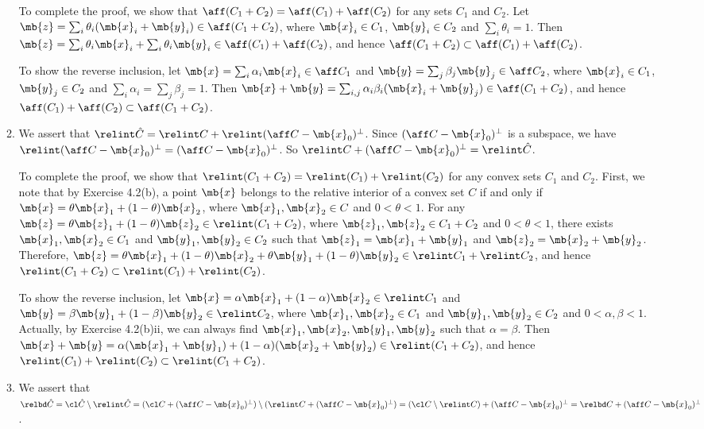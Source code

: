 \begin{exercise}
\begin{enumerate}
\begin{solution}
\begin{enumerate}
            To complete the proof, we show that $\aff(C_1 + C_2)=\aff(C_1)+\aff(C_2)$ for any sets $C_1$ and $C_2$. Let $\mb{z} = \sum_i \theta_i(\mb{x}_i + \mb{y}_i)\in\aff(C_1+C_2)$, where $\mb{x}_i\in C_1$, $\mb{y}_i\in C_2$ and $\sum_i \theta_i = 1$. Then $\mb{z} = \sum_i \theta_i\mb{x}_i + \sum_i \theta_i\mb{y}_i\in \aff(C_1) + \aff(C_2)$, and hence $\aff(C_1+C_2)\subset\aff(C_1)+\aff(C_2)$. 

            To show the reverse inclusion, let $\mb{x} = \sum_i \alpha_i\mb{x}_i \in \aff C_1$ and $\mb{y} = \sum_j \beta_j\mb{y}_j \in \aff C_2$, where $\mb{x}_i\in C_1$, $\mb{y}_j\in C_2$ and $\sum_i \alpha_i = \sum_j \beta_j = 1$. Then $\mb{x} + \mb{y} = \sum_{i,j} \alpha_i\beta_i(\mb{x}_i + \mb{y}_j) \in \aff(C_1+C_2)$, and hence $\aff(C_1)+\aff(C_2)\subset\aff(C_1+C_2)$. 
          \item We assert that $\relint \hat{C} = \relint C + \relint (\aff C-\mb{x}_0)^\perp$. Since $(\aff C-\mb{x}_0)^\perp$ is a subspace, we have $\relint (\aff C-\mb{x}_0)^\perp = (\aff C-\mb{x}_0)^\perp$. So $\relint C + (\aff C-\mb{x}_0)^\perp = \relint \hat{C}$.

            To complete the proof, we show that $\relint(C_1 + C_2)=\relint(C_1)+\relint(C_2)$ for any convex sets $C_1$ and $C_2$. First, we note that by Exercise 4.2(b), a point $\mb{x}$ belongs to the relative interior of a convex set $C$ if and only if $\mb{x} = \theta\mb{x}_1 + (1-\theta)\mb{x}_2$, where $\mb{x}_1, \mb{x}_2\in C$ and $0<\theta<1$. For any $\mb{z} = \theta\mb{z}_1 + (1-\theta)\mb{z}_2\in\relint(C_1+C_2)$, where $\mb{z}_1, \mb{z}_2\in C_1+C_2$ and $0<\theta<1$, there exists $\mb{x}_1, \mb{x}_2\in C_1$ and $\mb{y}_1, \mb{y}_2\in C_2$ such that $\mb{z}_1 = \mb{x}_1 + \mb{y}_1$ and $\mb{z}_2 = \mb{x}_2 + \mb{y}_2$. Therefore, $\mb{z} = \theta\mb{x}_1 + (1-\theta)\mb{x}_2 + \theta\mb{y}_1 + (1-\theta)\mb{y}_2 \in \relint C_1 + \relint C_2$, and hence $\relint(C_1+C_2)\subset\relint(C_1)+\relint(C_2)$.

            To show the reverse inclusion, let $\mb{x} = \alpha\mb{x}_1 + (1-\alpha)\mb{x}_2\in\relint C_1$ and $\mb{y} = \beta\mb{y}_1 + (1-\beta)\mb{y}_2\in\relint C_2$, where $\mb{x}_1, \mb{x}_2\in C_1$ and $\mb{y}_1, \mb{y}_2\in C_2$ and $0<\alpha,\beta<1$. Actually, by Exercise 4.2(b)ii, we can always find $\mb{x}_1, \mb{x}_2,\mb{y}_1, \mb{y}_2$ such that $\alpha=\beta$. Then $\mb{x} + \mb{y} = \alpha(\mb{x}_1 + \mb{y}_1) + (1-\alpha)(\mb{x}_2 + \mb{y}_2) \in \relint(C_1+C_2)$, and hence $\relint(C_1)+\relint(C_2)\subset\relint(C_1+C_2)$.
          \item We assert that $\relbd\hat{C} = \cl \hat{C} \setminus \relint\hat{C} = (\cl C + (\aff C-\mb{x}_0)^\perp) \setminus (\relint C + (\aff C-\mb{x}_0)^\perp) = (\cl C \setminus \relint C) + (\aff C-\mb{x}_0)^\perp = \relbd C + (\aff C-\mb{x}_0)^\perp $.


\end{enumerate}
\end{solution}
\end{enumerate}
\end{exercise}
